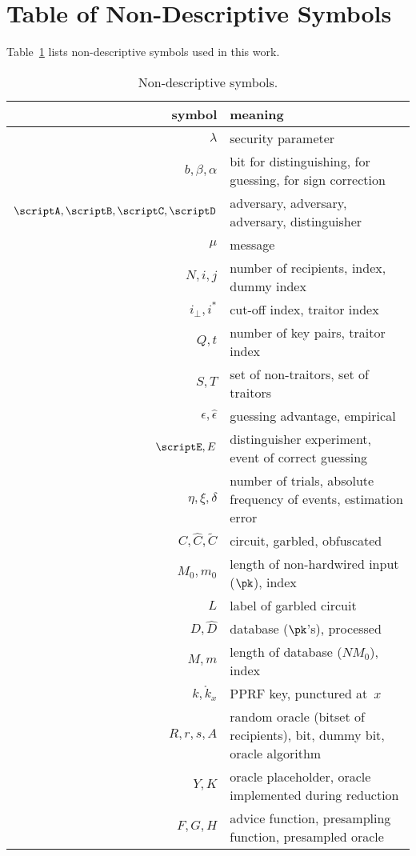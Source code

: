 \section{Table of Non-Descriptive Symbols}\label{sec:symbols}

Table~\ref{tab:symbols} lists non-descriptive symbols used in this work.

\begin{table}[h]
\capstart
\centering
\caption{Non-descriptive symbols.}
\label{tab:symbols}
\begingroup
\setlength{\tabcolsep}{4pt}
\begin{tabular}{rl}
\toprule
\textbf{symbol} & \textbf{meaning} \\
\midrule
$\lambda$ & security parameter \\
$b,\beta,\alpha$ & bit for distinguishing, for guessing, for sign correction \\
$\scriptA,\scriptB,\scriptC,\scriptD$ & adversary, adversary, adversary, distinguisher \\
$\mu$ & message \\
$N,i,j$ & number of recipients, index, dummy index \\
$i_\bot,i^\ast$ & cut-off index, traitor index \\
$Q,t$ & number of key pairs, traitor index \\
$S,T$ & set of non-traitors, set of traitors \\
$\epsilon,\widehat{\epsilon}$ & guessing advantage, empirical \\
$\scriptE,E$ & distinguisher experiment, event of correct guessing \\
$\eta,\xi,\delta$ & number of trials, absolute frequency of events, estimation error \\
$C,\widehat{C},\widetilde{C}$ & circuit, garbled, obfuscated \\
$M_0,m_0$ & length of non-hardwired input ($\pk$), index \\
$L$ & label of garbled circuit \\
$D,\widehat{D}$ & database ($\pk$'s), processed \\
$M,m$ & length of database ($NM_0$), index \\
$k,\mathring{k}_x$ & PPRF key, punctured at~$x$ \\
$R,r,s,A$ & random oracle (bitset of recipients), bit, dummy bit, oracle algorithm \\
$Y,K$ & oracle placeholder, oracle implemented during reduction \\
$F,G,H$ & advice function, presampling function, presampled oracle \\
\bottomrule
\end{tabular}
\endgroup
\end{table}
